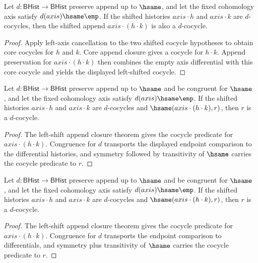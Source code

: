 \begin{theorem}
\label{thm:cohomology-cocycle-left-shift-append-closed}
Let $d:\mathsf{BHist}\to\mathsf{BHist}$ preserve append up to $\hsame$, and
let the fixed cohomology axis satisfy $d(axis)\hsame\emp$. If the shifted
histories $axis\cdot h$ and $axis\cdot k$ are $d$-cocycles, then the shifted
append $axis\cdot(h\cdot k)$ is also a $d$-cocycle.
\end{theorem}
\begin{proof}
Apply left-axis cancellation to the two shifted cocycle hypotheses to obtain
core cocycles for $h$ and $k$. Core append closure gives a cocycle for
$h\cdot k$. Append preservation for $axis\cdot(h\cdot k)$ then combines the
empty axis differential with this core cocycle and yields the displayed
left-shifted cocycle.
\end{proof}

\begin{theorem}
\label{thm:cohomology-cocycle-left-shift-append-hsame-transport}
Let $d:\mathsf{BHist}\to\mathsf{BHist}$ preserve append up to $\hsame$ and
be congruent for $\hsame$, and let the fixed cohomology axis satisfy
$d(axis)\hsame\emp$. If the shifted histories $axis\cdot h$ and
$axis\cdot k$ are $d$-cocycles and
$\hsame(axis\cdot(h\cdot k),r)$, then $r$ is a $d$-cocycle.
\end{theorem}
\begin{proof}
The left-shift append closure theorem gives the cocycle predicate for
$axis\cdot(h\cdot k)$. Congruence for $d$ transports the displayed endpoint
comparison to the differential histories, and symmetry followed by
transitivity of $\hsame$ carries the cocycle predicate to $r$.
\end{proof}

\begin{theorem}
\label{thm:cohomology-cocycle-prepend-hsame-transport}
Let $d:\mathsf{BHist}\to\mathsf{BHist}$ preserve append up to $\hsame$ and
be congruent for $\hsame$, and let the fixed cohomology axis satisfy
$d(axis)\hsame\emp$. If the shifted histories $axis\cdot h$ and
$axis\cdot k$ are $d$-cocycles and
$\hsame(axis\cdot(h\cdot k),r)$, then $r$ is a $d$-cocycle.
\end{theorem}
\begin{proof}
The left-shift append closure theorem gives the cocycle predicate for
$axis\cdot(h\cdot k)$. Congruence for $d$ transports the endpoint comparison
to differentials, and symmetry plus transitivity of $\hsame$ carries the
cocycle predicate to $r$.
\end{proof}

